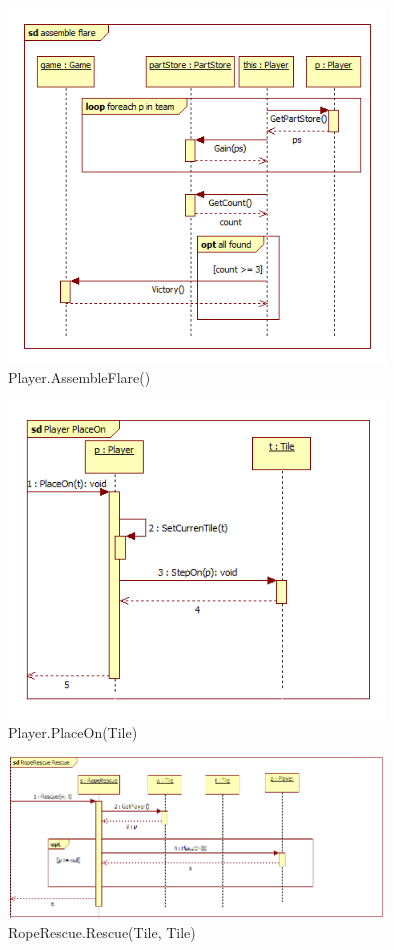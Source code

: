 \begin{figure}[H]
	\begin{center}
		\includegraphics[width=10cm]{chapters/chapter03/seqdiag/Player_assemble_flare.png}
		\caption{Player.AssembleFlare()}
		\label{fig:PlayerAssembleFlare}
	\end{center}
\end{figure}
\begin{figure}[H]
	\begin{center}
		\includegraphics[width=10cm]{chapters/chapter03/seqdiag/Player_PlaceOn.png}
		\caption{Player.PlaceOn(Tile)}
		\label{fig:PlayerPlaceOn}
	\end{center}
\end{figure}
\begin{figure}[H]
	\begin{center}
		\includegraphics[width=10cm]{chapters/chapter03/seqdiag/RopeRescue_Rescue.png}
		\caption{RopeRescue.Rescue(Tile, Tile)}
		\label{fig:RopeRescueRescue}
	\end{center}
\end{figure}

